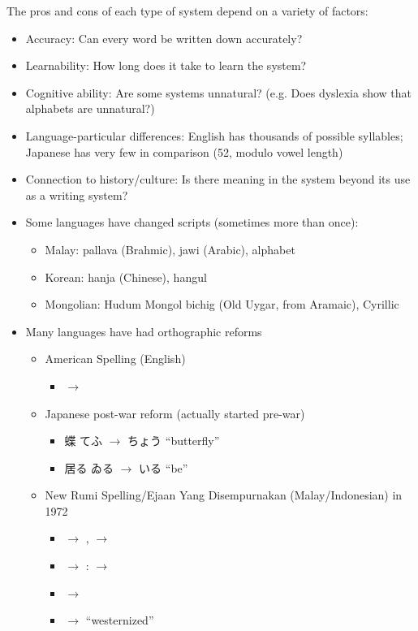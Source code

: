 \documentclass[a4paper,landscape,headrule,footrule,xetex]{foils}
\begin{document}
The pros and cons of each type of system depend on a variety of factors: 
\begin{itemize}
\item Accuracy:  Can every word be written down accurately?
\item Learnability: How long does it take to learn the system?
\item Cognitive ability: Are some systems unnatural? (e.g. Does dyslexia show that alphabets are unnatural?)
\item Language-particular differences: English has thousands of
  possible syllables; Japanese has very few in comparison (52, modulo
  vowel length)
\item Connection to history/culture: Is there meaning in the system
  beyond its use as a writing system?
  \newpage
\item Some languages have changed scripts (sometimes more than once):
  \begin{itemize}
  \item  Malay: pallava (Brahmic),  jawi (Arabic), alphabet
  \item  Korean: hanja (Chinese), hangul
  \item Mongolian: Hudum Mongol bichig (Old Uygar, from Aramaic), Cyrillic
  \end{itemize}
\item Many languages have had orthographic reforms
  \begin{itemize}
  \item American Spelling (English)
    \begin{itemize}
    \item {} $\rightarrow$ 
    \end{itemize}
  \item Japanese post-war reform (actually started pre-war)
    \begin{itemize}
    \item  蝶   てふ  $\rightarrow$  ちょう
       ``butterfly''
    \item  居る ゐる  $\rightarrow$  いる  ``be''
  \end{itemize}

\item New Rumi Spelling/Ejaan Yang Disempurnakan (Malay/Indonesian) in 1972
  \begin{itemize}
  \item {} $\rightarrow$ 	,  $\rightarrow$ 
  \item {}  $\rightarrow$ :   $\rightarrow$
  \item   {}	 $\rightarrow$ 
  \item   {}	 $\rightarrow$ 	``westernized''
  \end{itemize}
\end{itemize}
\end{itemize}
\end{document}
